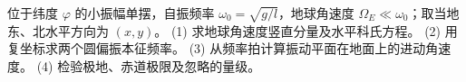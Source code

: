 位于纬度 $\varphi$ 的小振幅单摆，自振频率 $\omega_0=\sqrt{g/l}$，地球角速度 $\Omega_E\ll\omega_0$；取当地东、北水平方向为 $(x,y)$。
(1) 求地球角速度竖直分量及水平科氏方程。
(2) 用复坐标求两个圆偏振本征频率。
(3) 从频率拍计算振动平面在地面上的进动角速度。
(4) 检验极地、赤道极限及忽略的量级。

